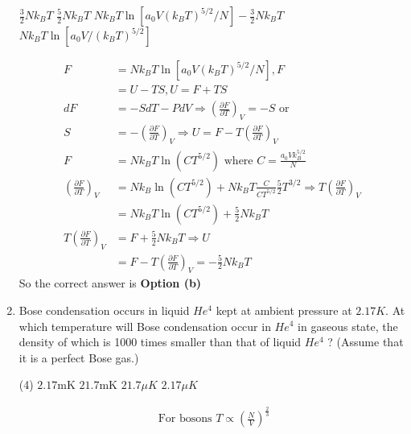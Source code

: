 \begin{enumerate}
\begin{tasks}
		\task[\textbf{a.}] $\frac{3}{2} N k_{B} T$
		\task[\textbf{b.}] $\frac{5}{2} N k_{B} T$
		\task[\textbf{c.}] $N k_{B} T \ln \left[a_{0} V\left(k_{B} T\right)^{5 / 2} / N\right]-\frac{3}{2} N k_{B} T$
		\task[\textbf{d.}] $N k_{B} T \ln \left[a_{0} V /\left(k_{B} T\right)^{5 / 2}\right]$
	\end{tasks}
\begin{answer}
	\begin{align*}
	F&=N k_{B} T \ln \left[a_{0} V\left(k_{B} T\right)^{5 / 2} / N\right], F\\&=U-T S, U=F+T S\\
	d F&=-S d T-P d V \Rightarrow\left(\frac{\partial F}{\partial T}\right)_{V}=-S \text{ or } \\S&=-\left(\frac{\partial F}{\partial T}\right)_{V} \Rightarrow U=F-T\left(\frac{\partial F}{\partial T}\right)_{V}\\
	F&=N k_{B} T \ln \left(C T^{5 / 2}\right)\text{ where }C=\frac{a_{0} V k_{B}^{5 / 2}}{N}\\
	\left(\frac{\partial F}{\partial T}\right)_{V}&=N k_{B} \ln \left(C T^{5 / 2}\right)+N k_{B} T \frac{C}{C T^{5 / 2}} \frac{5}{2} T^{3 / 2} \Rightarrow T\left(\frac{\partial F}{\partial T}\right)_{V}\\&=N k_{B} T \ln \left(C T^{5 / 2}\right)+\frac{5}{2} N k_{B} T\\
	T\left(\frac{\partial F}{\partial T}\right)_{V}&=F+\frac{5}{2} N k_{B} T \Rightarrow U\\&=F-T\left(\frac{\partial F}{\partial T}\right)_{V}=-\frac{5}{2} N k_{B} T
	\end{align*}
	So the correct answer is \textbf{Option (b)}
\end{answer}
	\item Bose condensation occurs in liquid $H e^{4}$ kept at ambient pressure at $2.17 K$. At which temperature will Bose condensation occur in $H e^{4}$ in gaseous state, the density of which is 1000 times smaller than that of liquid $H e^{4}$ ? (Assume that it is a perfect Bose gas.)
	{}
	\begin{tasks}(4)
		\task[\textbf{a.}] $2.17 \mathrm{mK}$
		\task[\textbf{b.}] $21.7 \mathrm{mK}$
		\task[\textbf{c.}] $21.7 \mu K$
		\task[\textbf{d.}] $2.17 \mu K$
	\end{tasks}
\begin{answer}
	\begin{align*}
	\text{	For bosons }T \propto\left(\frac{N}{V}\right)^{\frac{2}{3}}
	\end{align*}

\end{answer}
\end{enumerate}

